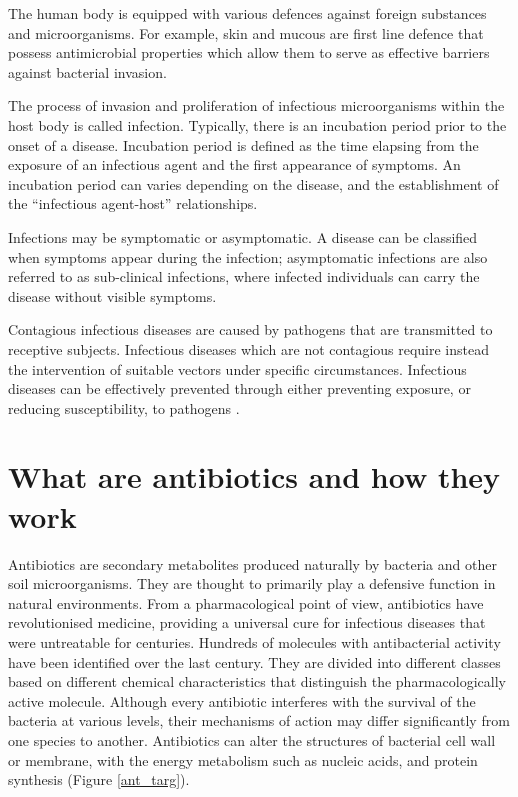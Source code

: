 \documentclass[11pt]{report}
\begin{document}
The human body is equipped with various defences against foreign substances and microorganisms.
For example, skin and mucous are first line defence that possess antimicrobial properties which allow them to serve as effective barriers against bacterial invasion.

The process of invasion and proliferation of infectious microorganisms within the host body is called infection.
Typically, there is an incubation period prior to the onset of a disease.
Incubation period is defined as the time elapsing from the exposure of an infectious agent and the first appearance of symptoms.
An incubation period can varies depending on the disease, and the establishment of the ``infectious agent-host'' relationships.

Infections may be symptomatic or asymptomatic.
A disease can be classified when symptoms appear during the infection; asymptomatic infections are also referred to as sub-clinical infections, where infected individuals can carry the disease without visible symptoms.

Contagious infectious diseases are caused by pathogens that are transmitted to receptive subjects.
Infectious diseases which are not contagious require instead the intervention of suitable vectors under specific circumstances.
Infectious diseases can be effectively prevented through either preventing exposure, or reducing susceptibility, to pathogens \cite{EPICentro}.

\chapter{What are antibiotics and how they work}
Antibiotics are secondary metabolites produced naturally by bacteria and other soil microorganisms.
They are thought to primarily play a defensive function in natural environments.
From a pharmacological point of view, antibiotics have revolutionised medicine, providing a universal cure for infectious diseases that were untreatable for centuries.
Hundreds of molecules with antibacterial activity have been identified over the last century.
They are divided into different classes based on different chemical characteristics that distinguish the pharmacologically active molecule.
Although every antibiotic interferes with the survival of the bacteria at various levels, their mechanisms of action may differ significantly from one species to another.
Antibiotics can alter the structures of bacterial cell wall or membrane, with the energy metabolism such as nucleic acids, and protein synthesis (Figure \ref{ant_targ}).
\end{document}

